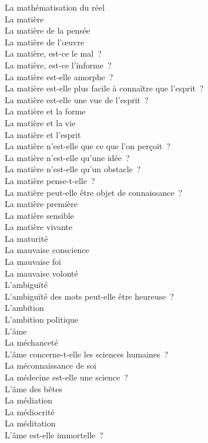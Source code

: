 \documentclass[a4paper,12pt]{article}
\begin{document}
La mathématisation du réel \\
La matière \\
La matière de la pensée \\
La matière de l'œuvre \\
La matière, est-ce le mal ? \\
La matière, est-ce l'informe ? \\
La matière est-elle amorphe ? \\
La matière est-elle plus facile à connaître que l'esprit ? \\
La matière est-elle une vue de l'esprit ? \\
La matière et la forme \\
La matière et la vie \\
La matière et l'esprit \\
La matière n'est-elle que ce que l'on perçoit ? \\
La matière n'est-elle qu'une idée ? \\
La matière n'est-elle qu'un obstacle ? \\
La matière pense-t-elle ? \\
La matière peut-elle être objet de connaissance ? \\
La matière première \\
La matière sensible \\
La matière vivante \\
La maturité \\
La mauvaise conscience \\
La mauvaise foi \\
La mauvaise volonté \\
L'ambiguïté \\
L'ambiguïté des mots peut-elle être heureuse ? \\
L'ambition \\
L'ambition politique \\
L'âme \\
La méchanceté \\
L'âme concerne-t-elle les sciences humaines ? \\
La méconnaissance de soi \\
La médecine est-elle une science ? \\
L'âme des bêtes \\
La médiation \\
La médiocrité \\
La méditation \\
L'âme est-elle immortelle ? \\
\end{document}

